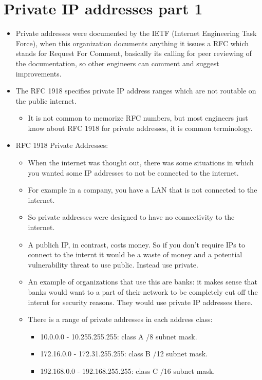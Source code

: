\section{Private IP addresses part 1}
\begin{itemize}
    \item Private addresses were documented by the IETF (Internet Engineering Task Force), when this organization documents anything it issues a RFC which stands for Request For Comment, basically its calling for peer reviewing of the documentation, so other engineers can comment and suggest improvements.
    \item The RFC 1918 specifies private IP address ranges which are not routable on the public internet.
        \begin{itemize}
            \item It is not common to memorize RFC numbers, but most engineers just know about RFC 1918 for private addresses, it is common terminology.
        \end{itemize}

    \item RFC 1918 Private Addresses:
        \begin{itemize}
            \item When the internet was thought out, there was some situations in which you wanted some IP addresses to not be connected to the internet. 
            \item For example in a company, you have a LAN that is not connected to the internet. 
            \item So private addresses were designed to have no connectivity to the internet.
            \item A publich IP, in contrast, costs money. So if you don't require IPs to connect to the internt it would be a waste of money and a potential vulnerability threat to use public. Instead use private.
            \item An example of organizations that use this are banks: it makes sense that banks would want to a part of their network to be completely cut off the internt for security reasons. They would use private IP addresses there. 
            \item There is a range of private addresses in each address class:
                \begin{itemize}
                    \item 10.0.0.0 - 10.255.255.255: class A /8 subnet mask.
                    \item 172.16.0.0 - 172.31.255.255: class B /12 subnet mask.
                    \item 192.168.0.0 - 192.168.255.255: class C /16 subnet mask.
                \end{itemize}
        \end{itemize}
    

\end{itemize}
